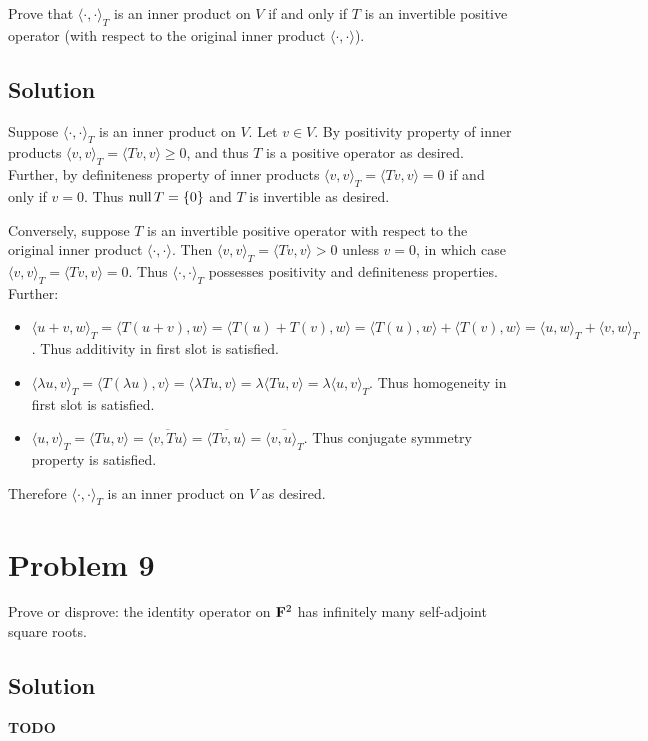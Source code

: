 \documentclass{article}
\begin{document}
Prove that $\langle\cdot,\cdot\rangle_T$ is an inner product on $V$ if and only if $T$ is an invertible positive operator (with respect to the original inner product $\langle\cdot,\cdot\rangle$).

\subsection*{Solution}
Suppose $\langle\cdot,\cdot\rangle_T$ is an inner product on $V$. Let $v\in V$. By positivity property of inner products $\langle v,v\rangle_T=\langle Tv, v\rangle\geq 0$, and thus $T$ is a positive operator as desired. Further, by definiteness property of inner products $\langle v,v\rangle_T=\langle Tv, v\rangle=0$ if and only if $v=0$. Thus $\text{null}\, T=\{0\}$ and $T$ is invertible as desired.

\vs

Conversely, suppose $T$ is an invertible positive operator with respect to the original inner product $\langle\cdot,\cdot\rangle$. Then $\langle v,v\rangle_T=\langle Tv, v\rangle>0$ unless $v=0$, in which case $\langle v,v\rangle_T=\langle Tv, v\rangle=0$. Thus $\langle\cdot,\cdot\rangle_T$ possesses positivity and definiteness properties. Further:
\begin{itemize}
    \item $\langle u+v,w\rangle_T=\langle T(u+v), w\rangle=\langle T(u)+T(v), w\rangle=\langle T(u), w\rangle+\langle T(v), w\rangle=\langle u,w\rangle_T+\langle v,w\rangle_T$. Thus additivity in first slot is satisfied.
    \item $\langle \lambda u,v\rangle_T=\langle T(\lambda u), v\rangle=\langle \lambda Tu, v\rangle=\lambda\langle Tu, v\rangle=\lambda\langle u,v\rangle_T$. Thus homogeneity in first slot is satisfied.
    \item $\langle u,v\rangle_T=\langle Tu, v\rangle=\overline{\langle v, Tu\rangle}=\overline{\langle Tv, u\rangle}=\overline{\langle v,u\rangle_T}$. Thus conjugate symmetry property is satisfied.
\end{itemize}
Therefore $\langle\cdot,\cdot\rangle_T$ is an inner product on $V$ as desired.

\section*{Problem 9}
Prove or disprove: the identity operator on $\mathbf{F}^2$ has infinitely many self-adjoint square roots.

\subsection*{Solution}
\textbf{TODO}
\end{document}
